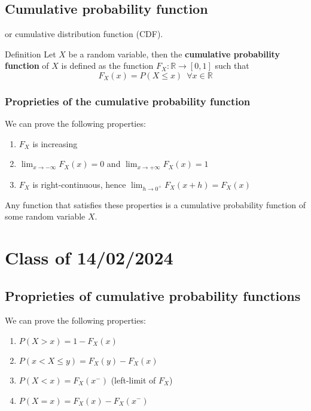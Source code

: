 \documentclass[10pt]{extarticle}
\newcommand{\R}{\mathbb{R}}
\begin{document}
\subsection{Cumulative probability function}

or cumulative distribution function (CDF).

\begin{bluebox}{Definition}
    Let $X$ be a random variable, then the \textbf{cumulative probability function} of $X$ is defined as the function $F_X: \R \to [0, 1]$ such that
    $$
        F_X(x) = P(X \leq x) \enspace \forall x \in \R
    $$
\end{bluebox}

\subsubsection{Proprieties of the cumulative probability function}

We can prove the following properties:
\begin{enumerate}
    \item $F_X$ is increasing
    \item $\lim_{x \to -\infty} F_X(x) = 0$ and $\lim_{x \to +\infty} F_X(x) = 1$
    \item $F_X$ is right-continuous, hence $\lim_{h \to 0^+} F_X(x + h) = F_X(x)$
\end{enumerate}

Any function that satisfies these properties is a cumulative probability function of some random variable $X$.

\section{Class of 14/02/2024}

\subsection{Proprieties of cumulative probability functions}

We can prove the following properties:
\begin{enumerate}
    \item $P(X > x) = 1 - F_X(x)$
    \item $P(x < X \leq y) = F_X(y) - F_X(x)$
    \item $P(X < x) = F_X(x^-)$ (left-limit of $F_X$)
    \item $P(X = x) = F_X(x) - F_X(x^-)$
\end{enumerate}
\end{document}
